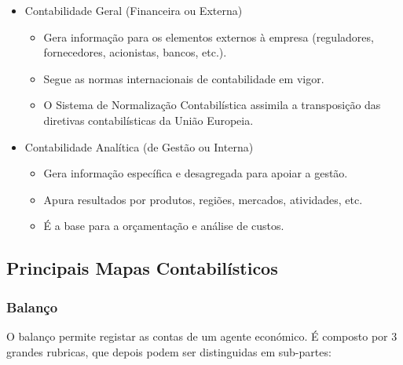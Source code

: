 \documentclass[11pt]{article}
\begin{document}
\begin{itemize}
    \item Contabilidade Geral (Financeira ou Externa)
          \begin{itemize}
              \item Gera informação para os elementos externos à empresa         (reguladores, fornecedores, acionistas, bancos, etc.).
              \item Segue as normas internacionais de contabilidade em vigor.
              \item O Sistema de Normalização Contabilística assimila a
                    transposição das diretivas contabilísticas da União Europeia.
          \end{itemize}
    \item Contabilidade Analítica (de Gestão ou Interna)
          \begin{itemize}
              \item Gera informação específica e desagregada para apoiar a gestão.
              \item Apura resultados por produtos, regiões, mercados, atividades, etc.
              \item É a base para a orçamentação e análise de custos.
          \end{itemize}
\end{itemize}

\subsection{Principais Mapas Contabilísticos}

\subsubsection{Balanço}

O balanço permite registar as contas de um agente económico. É composto por 3 grandes rubricas, que depois podem ser distinguidas em sub-partes:
\end{document}

